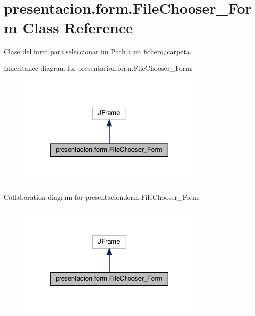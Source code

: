 \hypertarget{classpresentacion_1_1form_1_1FileChooser__Form}{}\section{presentacion.\+form.\+File\+Chooser\+\_\+\+Form Class Reference}
\label{classpresentacion_1_1form_1_1FileChooser__Form}


Clase del form para seleccionar un Path a un fichero/carpeta.  




Inheritance diagram for presentacion.\+form.\+File\+Chooser\+\_\+\+Form\+:\nopagebreak
\begin{figure}[H]
\begin{center}
\leavevmode
\includegraphics[width=258pt]{classpresentacion_1_1form_1_1FileChooser__Form__inherit__graph}
\end{center}
\end{figure}


Collaboration diagram for presentacion.\+form.\+File\+Chooser\+\_\+\+Form\+:\nopagebreak
\begin{figure}[H]
\begin{center}
\leavevmode
\includegraphics[width=258pt]{classpresentacion_1_1form_1_1FileChooser__Form__coll__graph}
\end{center}
\end{figure}
